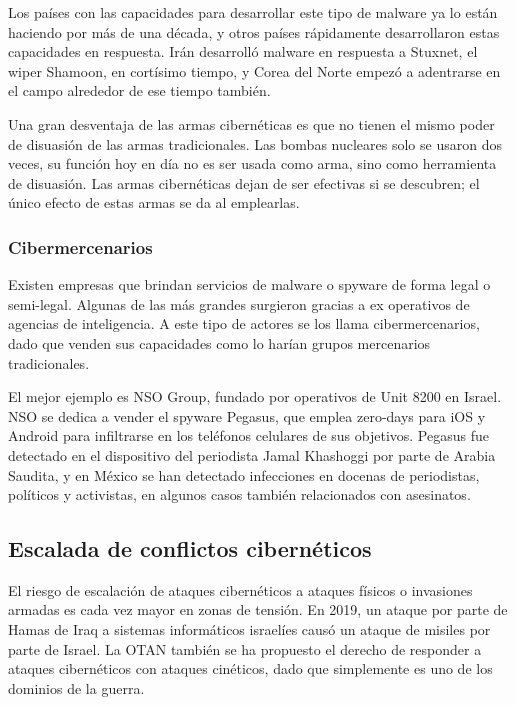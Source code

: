 \documentclass{article}
\begin{document}
Los países con las capacidades para desarrollar este tipo de malware ya lo están haciendo por más de una década, y otros países rápidamente desarrollaron estas capacidades en respuesta. Irán desarrolló malware en respuesta a Stuxnet, el wiper Shamoon, en cortísimo tiempo, y Corea del Norte empezó a adentrarse en el campo alrededor de ese tiempo también. \autocite{darknetdiaries-stuxnet} \autocite{infosecurity-cyberwar}

Una gran desventaja de las armas cibernéticas es que no tienen el mismo poder de disuasión de las armas tradicionales. Las bombas nucleares solo se usaron dos veces, su función hoy en día no es ser usada como arma, sino como herramienta de disuasión. Las armas cibernéticas dejan de ser efectivas si se descubren; el único efecto de estas armas se da al emplearlas. \autocite{pcmag-cyberwar}

\subsubsection{Cibermercenarios}
Existen empresas que brindan servicios de malware o spyware de forma legal o semi-legal. Algunas de las más grandes surgieron gracias a ex operativos de agencias de inteligencia. A este tipo de actores se los llama cibermercenarios, dado que venden sus capacidades como lo harían grupos mercenarios tradicionales. \autocite{oodaloop-cybermercenaries}

El mejor ejemplo es NSO Group, fundado por operativos de Unit 8200 en Israel. NSO se dedica a vender el spyware Pegasus, que emplea zero-days para iOS y Android para infiltrarse en los teléfonos celulares de sus objetivos. Pegasus fue detectado en el dispositivo del periodista Jamal Khashoggi por parte de Arabia Saudita, y en México se han detectado infecciones en docenas de periodistas, políticos y activistas, en algunos casos también relacionados con asesinatos. \autocite{guardian-cybermercenaries} \autocite{citizenlab-cybermercenaries}

\subsection{Escalada de conflictos cibernéticos}
El riesgo de escalación de ataques cibernéticos a ataques físicos o invasiones armadas es cada vez mayor en zonas de tensión. En 2019, un ataque por parte de Hamas de Iraq a sistemas informáticos israelíes causó un ataque de misiles por parte de Israel. La OTAN también se ha propuesto el derecho de responder a ataques cibernéticos con ataques cinéticos, dado que simplemente es uno de los dominios de la guerra. \autocite{pcmag-cyberwar} \autocite{nationaldefense-nato}
\end{document}

